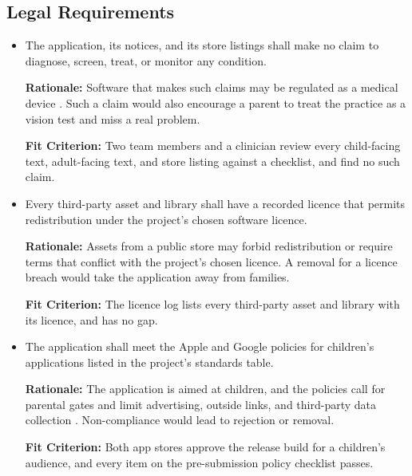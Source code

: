 \documentclass[12pt]{article}
\newcounter{nfrnum} %
\begin{document}
\subsection{Legal Requirements}

\begin{itemize}

\item[\refstepcounter{nfrnum}\textbf{NFR\thenfrnum}\label{NFR_NoClaims}:]
The application, its notices, and its store listings shall make no claim to diagnose, screen, treat, or monitor any condition.

\textbf{Rationale:} Software that makes such claims may be regulated as a medical device \cite{HealthCanadaSaMD}. Such a claim would also encourage a parent to treat the practice as a vision test and miss a real problem.

\textbf{Fit Criterion:} Two team members and a clinician review every child-facing text, adult-facing text, and store listing against a checklist, and find no such claim.

\item[\refstepcounter{nfrnum}\textbf{NFR\thenfrnum}\label{NFR_Licensing}:]
Every third-party asset and library shall have a recorded licence that permits redistribution under the project's chosen software licence.

\textbf{Rationale:} Assets from a public store may forbid redistribution or require terms that conflict with the project's chosen licence. A removal for a licence breach would take the application away from families.

\textbf{Fit Criterion:} The licence log lists every third-party asset and library with its licence, and has no gap.

\item[\refstepcounter{nfrnum}\textbf{NFR\thenfrnum}\label{NFR_StoreCompliance}:]
The application shall meet the Apple and Google policies for children's applications listed in the project's standards table.

\textbf{Rationale:} The application is aimed at children, and the policies call for parental gates and limit advertising, outside links, and third-party data collection \cite{AppleGuidelines, GooglePlayPolicy}. Non-compliance would lead to rejection or removal.

\textbf{Fit Criterion:} Both app stores approve the release build for a children's audience, and every item on the pre-submission policy checklist passes.

\end{itemize}
 
\end{document}
